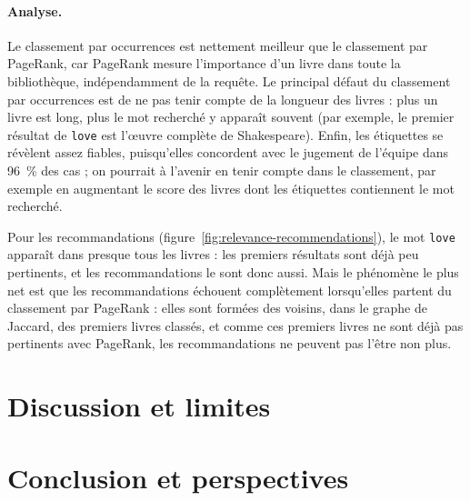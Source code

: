 \documentclass[11pt,a4paper]{article}
\begin{document}
\paragraph{Analyse.}
Le classement par occurrences est nettement meilleur que le classement par PageRank, car PageRank mesure l'importance d'un livre dans toute la bibliothèque, indépendamment de la requête. Le principal défaut du classement par occurrences est de ne pas tenir compte de la longueur des livres : plus un livre est long, plus le mot recherché y apparaît souvent (par exemple, le premier résultat de \texttt{love} est l'œuvre complète de Shakespeare). Enfin, les étiquettes se révèlent assez fiables, puisqu'elles concordent avec le jugement de l'équipe dans 96~\% des cas ; on pourrait à l'avenir en tenir compte dans le classement, par exemple en augmentant le score des livres dont les étiquettes contiennent le mot recherché.

Pour les recommandations (figure~\ref{fig:relevance-recommendations}), le mot \texttt{love} apparaît dans presque tous les livres : les premiers résultats sont déjà peu pertinents, et les recommandations le sont donc aussi. Mais le phénomène le plus net est que les recommandations échouent complètement lorsqu'elles partent du classement par PageRank : elles sont formées des voisins, dans le graphe de Jaccard, des premiers livres classés, et comme ces premiers livres ne sont déjà pas pertinents avec PageRank, les recommandations ne peuvent pas l'être non plus.

\section{Discussion et limites}

\section{Conclusion et perspectives}
\end{document}
